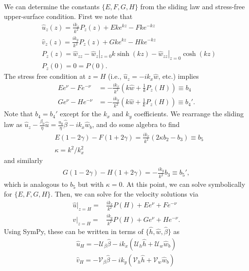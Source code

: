 \documentclass[paper=a4, fontsize=11pt]{article}
\begin{document}
We can determine the constants $\{E,F,G,H\}$ from the sliding law and stress-free
upper-surface condition.
First we note that
\begin{align}
&\widehat{u}_z(z) = \frac{ik_x }{k^2} P_z(z)
+ E k e^{kz} - F k e^{-kz} \\
&\widehat{v}_z(z) = \frac{ik_y }{k^2} P_z(z) + G k  e^{kz} - H k e^{-kz} \\
&P_z(z) = \widehat{w}_{zz}-\widehat{w}_z|_{z=0}k\sinh(kz) - \widehat{w}_{zz}|_{z=0}\cosh(kz)\\
&P_z(0) = 0 = P(0).
\end{align}
The stress free condition at $z=H$ (i.e., $\widehat{u}_z = -ik_x \widehat{w}$, etc.)
implies
\begin{align}
 E  e^{\nu} - F  e^{-\nu} &= -\frac{ik_x}{k^2} \left(k\widehat{w}+\frac{1}{k}P_{z}(H)\right)\equiv b_4 \\
  G  e^{\nu} - H  e^{-\nu} &= -\frac{ik_y}{k^2} \left(k\widehat{w}+\frac{1}{k}P_{z}(H)\right) \equiv b_4'.
\end{align}
Note that $b_4=b_4'$ except for the $k_x$ and $k_y$ coefficients.
We rearrange the sliding law as $\widehat{u}_z - \frac{\beta_0}{\eta}\widehat{u}=\frac{u_0}{\eta}\widehat{\beta}
-ik_x\widehat{w}_b$, and do some algebra to find
\begin{align}
&E (1-2\gamma) - F (1+2\gamma) =
\frac{ik_x}{k^2}\left(2\kappa b_2 - b_3 \right)  \equiv b_5 \\
&\kappa = {k}^2/k_x^2
\end{align}
and similarly
\begin{align}
G (1-2\gamma) -H (1+2\gamma) = -\frac{ik_y}{k^2}b_3 \equiv b_5',
\end{align}
which is analogous to $b_5$ but with $\kappa=0$.
At this point, we can solve symbolically for $\{E,F,G,H\}$.
Then, we can solve for the velocity solutions via
\begin{align}
\widehat{u}|_{z=H} =&  \frac{ik_x }{k^2} P(H) + E e^{\nu} + F e^{-\nu}  \\
\widehat{v}|_{z=H} =& \frac{ik_y }{k^2} P(H)+ G e^{\nu} + H e^{-\nu}.
\end{align}
Using SymPy, these can be written in terms of $\{\widehat{h},\widehat{w},\widehat{\beta}\}$ as
\begin{align}
\widehat{u}_H =    -\mathcal{U}_{\beta} \widehat{\beta} -ik_x\left(\mathcal{U}_h\widehat{h} +  \mathcal{U}_w\widehat{w}_b\right) \label{uH}\\
\widehat{v}_H =  -\mathcal{V}_{\beta} \widehat{\beta}-ik_y\left(\mathcal{V}_h\widehat{h} +  \mathcal{V}_w\widehat{w}_b\right)\label{vH}
\end{align}
\end{document}
